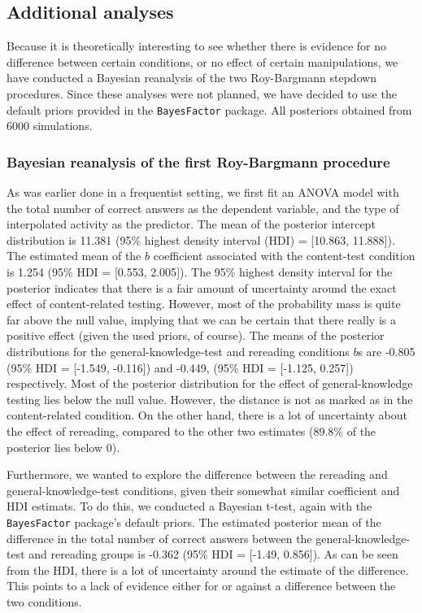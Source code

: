 \documentclass[11pt,]{article}
\begin{document}
\hypertarget{additional-analyses}{%
\subsection{Additional analyses}\label{additional-analyses}}

Because it is theoretically interesting to see whether there is evidence
for no difference between certain conditions, or no effect of certain
manipulations, we have conducted a Bayesian reanalysis of the two
Roy-Bargmann stepdown procedures. Since these analyses were not planned,
we have decided to use the default priors provided in the
\texttt{BayesFactor} \citep{moreyBayesFactorComputationBayes2018}
package. All posteriors obtained from 6000 simulations.

\hypertarget{bayesian-reanalysis-of-the-first-roy-bargmann-procedure}{%
\subsubsection{Bayesian reanalysis of the first Roy-Bargmann
procedure}\label{bayesian-reanalysis-of-the-first-roy-bargmann-procedure}}

As was earlier done in a frequentist setting, we first fit an ANOVA
model with the total number of correct answers as the dependent
variable, and the type of interpolated activity as the predictor. The
mean of the posterior intercept distribution is 11.381 (95\% highest
density interval (HDI) = {[}10.863, 11.888{]}). The estimated mean of
the \(b\) coefficient associated with the content-test condition is
1.254 (95\% HDI = {[}0.553, 2.005{]}). The 95\% highest density interval
for the posterior indicates that there is a fair amount of uncertainty
around the exact effect of content-related testing. However, most of the
probability mass is quite far above the null value, implying that we can
be certain that there really is a positive effect (given the used
priors, of course). The means of the posterior distributions for the
general-knowledge-test and rereading conditions \(b\)s are -0.805 (95\%
HDI = {[}-1.549, -0.116{]}) and -0.449, (95\% HDI = {[}-1.125, 0.257{]})
respectively. Most of the posterior distribution for the effect of
general-knowledge testing lies below the null value. However, the
distance is not as marked as in the content-related condition. On the
other hand, there is a lot of uncertainty about the effect of rereading,
compared to the other two estimates (89.8\% of the posterior lies below
0).

Furthermore, we wanted to explore the difference between the rereading
and general-knowledge-test conditions, given their somewhat similar
coefficient and HDI estimats. To do this, we conducted a Bayesian
t-test, again with the \texttt{BayesFactor} package's default priors.
The estimated posterior mean of the difference in the total number of
correct answers between the general-knowledge-test and rereading groups
is -0.362 (95\% HDI = {[}-1.49, 0.856{]}). As can be seen from the HDI,
there is a lot of uncertainty around the estimate of the difference.
This points to a lack of evidence either for or against a difference
between the two conditions.
\end{document}
